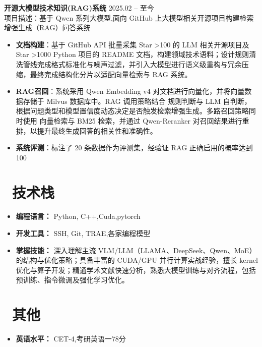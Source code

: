 \documentclass[11pt]{article}
\newlength{\interProjectSpacing}
\newcommand{\projectsep}{\vspace{\interProjectSpacing}}
\newlength{\intraProjectTitleSep}
\newcommand{\titlebreak}{\\[\intraProjectTitleSep]}
\newlength{\intraProjectListTopSep}
\begin{document}
\projectsep

\textbf{开源大模型技术知识(RAG)系统} \hfill 2025.02 -- 至今 \titlebreak
项目描述：基于 Qwen 系列大模型,面向 GitHub 上大模型相关开源项目构建检索增强生成（RAG）问答系统
\begin{itemize}[nosep, topsep=\intraProjectListTopSep]
    \item \textbf{文档构建}：基于 GitHub API 批量采集 Star >100 的 LLM 相关开源项目及 Star >1000 Python 项目的 README 文档，构建领域技术语料；设计规则清洗管线完成格式标准化与噪声过滤，并引入大模型进行语义级重构与冗余压缩，最终完成结构化分片以适配向量检索与 RAG 系统。
    \item \textbf{RAG召回}：系统采用 Qwen Embedding v4 对文档进行向量化，并将向量数据存储于 Milvus 数据库中。RAG 调用策略结合 规则判断与 LLM 自判断，根据问题类型和模型置信度动态决定是否触发检索增强生成。多路召回策略同时使用 向量检索与 BM25 检索，并通过 Qwen-Reranker 对召回结果进行重排，以提升最终生成回答的相关性和准确性。
    \item \textbf{系统评测}：标注了 20 条数据作为评测集，经验证 RAG 正确启用的概率达到 100%
\end{itemize}

\section{\makebox[\widthof{\faCogs}][c]{\color{CVBlue}\faCogs}\ 技术栈}
\begin{itemize}[nosep]
    \item \textbf{编程语言：} Python, C++,Cuda,pytorch
    \item \textbf{开发工具：} SSH, Git, TRAE,各家编程模型
    \item \textbf{掌握技能：} 深入理解主流 VLM/LLM（LLAMA、DeepSeek、Qwen、MoE）的结构与优化策略；具备丰富的 CUDA/GPU 并行计算实战经验，擅长 kernel 优化与算子开发；精通学术文献快速分析，熟悉大模型训练与对齐流程，包括预训练、指令微调及强化学习优化。
\end{itemize}
    
\section{\makebox[\widthof{\faInfo}][c]{\color{CVBlue}\faInfo}\ 其他}
\begin{itemize}[parsep=0.5ex]
    \item \textbf{英语水平：} CET-4,考研英语一78分
\end{itemize}
\end{document}

